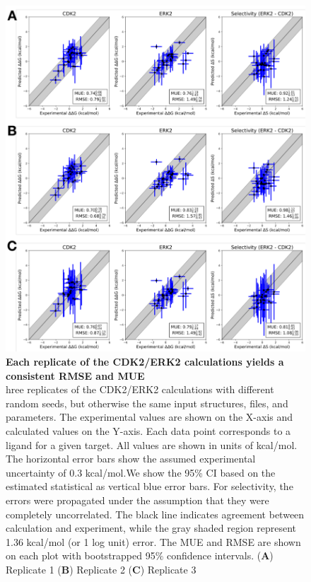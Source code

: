 \documentclass[phd,tocprelim]{cornell}
\begin{document}
\begin{appendices}
	\begin{landscape}
		\begin{figure}[p]
			\centering
			\includegraphics[width=0.46\linewidth]{figures/supp_figure6.pdf}
			\caption[Each replicate of the CDK2/ERK2 calculations yields a consistent RMSE and MUE]{
				{\bf Each replicate of the CDK2/ERK2 calculations yields a consistent RMSE and MUE} \\
				hree replicates of the CDK2/ERK2 calculations with different random seeds, but otherwise the same input structures, files, and parameters. The experimental values are shown on the X-axis and calculated values on the Y-axis. Each data point corresponds to a ligand for a given target. All values are shown in units of kcal/mol. The horizontal error bars show the assumed experimental uncertainty of 0.3 kcal/mol\citep{BROWN2009420}.We show the 95\% CI based on the estimated statistical as vertical blue error bars. For selectivity, the errors were propagated under the assumption that they were completely uncorrelated.  The black line indicates agreement between calculation and experiment, while the gray shaded region represent 1.36 kcal/mol (or 1 log unit) error. The MUE and RMSE are shown on each plot with bootstrapped 95$\%$ confidence intervals. ({\bf A}) Replicate 1 ({\bf B}) Replicate 2 ({\bf C}) Replicate 3}
			\label{fig:sup-figure-6}
		\end{figure}
	\end{landscape}
	

\end{appendices}
\end{document}
